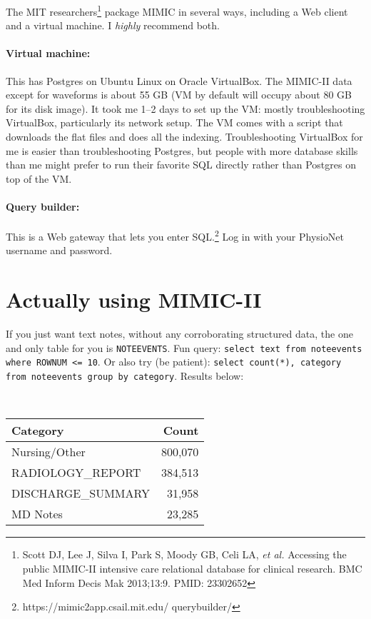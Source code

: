 \documentclass{tufte-handout}
\begin{document}
The MIT researchers\footnote{Scott DJ, Lee J, Silva I, Park S, Moody
  GB, Celi LA, \emph{et al.} Accessing the public MIMIC-II intensive
  care relational database for clinical research. BMC Med Inform Decis
  Mak 2013;13:9. PMID: 23302652 } package MIMIC in several ways,
including a Web client and a virtual machine. I \emph{highly}
recommend both.

\paragraph{Virtual machine:} This has Postgres on Ubuntu Linux on Oracle
VirtualBox. The MIMIC-II data except for waveforms is about 55 GB (VM
by default will occupy about 80 GB for its disk image). It took me
1--2 days to set up the VM: mostly troubleshooting VirtualBox,
particularly its network setup. The VM comes with a script that
downloads the flat files and does all the indexing. Troubleshooting
VirtualBox for me is easier than troubleshooting Postgres, but people
with more database skills than me might prefer to run their favorite
SQL directly rather than Postgres on top of the VM.

\paragraph{Query builder:} This is a Web gateway that lets you enter
SQL.\footnote{https://mimic2app.csail.mit.edu/ querybuilder/} Log in
with your PhysioNet username and password.

\section{Actually using MIMIC-II}

If you just want text notes, without any corroborating structured
data, the one and only table for you is \texttt{NOTEEVENTS}. Fun
query: \texttt{select text from noteevents where ROWNUM <= 10}. Or
also try (be patient): \texttt{select count(*), category from
  noteevents group by category}. Results below:

~\\

\begin{tabular}{l r}
\hline
Category & Count \\
\hline
Nursing/Other & 800,070 \\
RADIOLOGY\_REPORT & 384,513 \\
DISCHARGE\_SUMMARY & 31,958 \\
MD Notes & 23,285 \\
\hline
\end{tabular}
\end{document}
